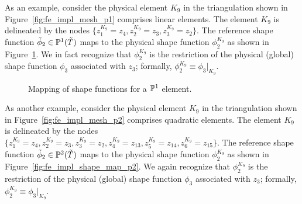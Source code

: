 As an example, consider the physical element $K_9$ in the triangulation shown in Figure~\ref{fig:fe_impl_mesh_p1} comprises linear elements.  The element $K_9$ is delineated by the nodes $\{ z^{K_9}_1 = z_4, z^{K_9}_2 = z_3, z^{K_9}_3 = z_2 \}$. The reference shape function $\tilde \phi_2 \in \mathbb{P}^1(\tilde T)$ maps to the physical shape function $\phi_2^{K_9}$ as shown in Figure~\ref{fig:fe_impl_shape_map_p1}.  We in fact recognize that $\phi_2^{K_9}$ is the restriction of the physical (global) shape function $\phi_3$ associated with $z_3$; formally, $\phi_2^{K_9} \equiv \phi_3|_{K_9}$. %



\begin{figure}
  \centering
  \caption{Mapping of shape functions for a $\mathbb{P}^1$ element.}
  \label{fig:fe_impl_shape_map_p1}
\end{figure}


As another example, consider the physical element $K_9$ in the triangulation shown in Figure~\ref{fig:fe_impl_mesh_p2} comprises quadratic elements. The element $K_9$ is delineated by the nodes $\{ z^{K_9}_1 = z_4, z^{K_9}_2 = z_3, z^{K_9}_3 = z_2,  z^{K_9}_4 = z_{13},  z^{K_9}_5 = z_{14},  z^{K_9}_6 = z_{15} \}$.  The reference shape function $\tilde \phi_2 \in \mathbb{P}^2(\tilde T)$ maps to the physical shape function $\phi_2^{K_9}$ as shown in Figure~\ref{fig:fe_impl_shape_map_p2}.  We again recognize that $\phi_2^{K_9}$ is the restriction of the physical (global) shape function $\phi_3$ associated with $z_3$; formally, $\phi_2^{K_9} \equiv \phi_3|_{K_9}$.


